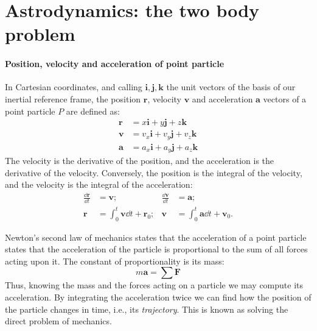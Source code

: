 \section[Astrodynamics]{Astrodynamics: the two body problem}

\paragraph{Position, velocity and acceleration of point particle}

In Cartesian coordinates, and calling $\bm i,\bm j, \bm k$ the unit vectors
of the basis of our inertial reference frame, the position $\bm r$, velocity 
$\bm v$ and acceleration $\bm a$ vectors of a point particle $P$ are defined 
as:
%
\begin{align}
\bm r &= x\bm i + y \bm j + z \bm k
\\
\bm v &= v_x\bm i + v_y \bm j + v_z \bm k
\\
\bm a &= a_x\bm i + a_y \bm j + a_z \bm k
\end{align}
%
The velocity is the derivative of the position, and the acceleration is the 
derivative of the velocity. Conversely, the position is the integral of the 
velocity, and the velocity is the integral of the acceleration:
%
\begin{align}
\frac{\dd \bm r}{\dd t} &= \bm v;
&\frac{\dd \bm v}{\dd t} &= \bm a;
\\
\bm r &= \int_0^t \bm v \dd t + \bm r_0;
&\bm v &= \int_0^t \bm a \dd t + \bm v_0.
\end{align}
%

Newton's second law of mechanics states that the acceleration of a point 
particle states that the acceleration of the particle is proportional to the 
sum of all forces acting upon it. The constant of proportionality is its mass:
%
\begin{equation}
m\bm a = \sum \bm F
\end{equation}
%
Thus, knowing the mass and the forces acting on a particle we may compute its 
acceleration. By integrating the acceleration twice we can find how the 
position of the particle changes in time, i.e., its \emph{trajectory}. This
is known as solving the direct problem of mechanics.

